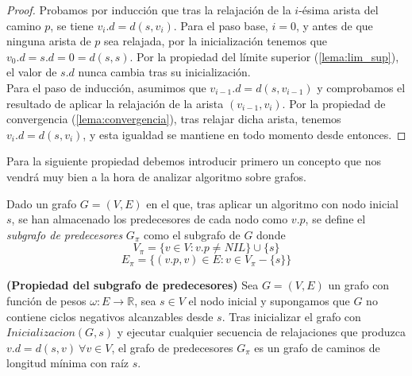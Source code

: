 \begin{proof}
	Probamos por inducción que tras la relajación de la $i$-ésima arista del camino $p$, se tiene $v_i.d=d(s,v_i)$. Para el paso base, $i=0$, y antes de que ninguna arista de $p$ sea relajada, por la inicialización tenemos que $v_0.d=s.d=0=d(s,s)$. Por la propiedad del límite superior (\autoref{lema:lim_sup}), el valor de $s.d$ nunca cambia tras su inicialización. \\
	Para el paso de inducción, asumimos que $v_{i-1}.d=d(s,v_{i-1})$ y comprobamos el resultado de aplicar la relajación de la arista $(v_{i-1},v_i)$. Por la propiedad de convergencia (\autoref{lema:convergencia}), tras relajar dicha arista, tenemos $v_i.d=d(s,v_i)$, y esta igualdad se mantiene en todo momento desde entonces.
\end{proof}

Para la siguiente propiedad debemos introducir primero un concepto que nos vendrá muy bien a la hora de analizar algoritmo sobre grafos.

\begin{definicion}
	Dado un grafo $G=(V,E)$ en el que, tras aplicar un algoritmo con nodo inicial $s$, se han almacenado los predecesores de cada nodo como $v.p$, se define el \textit{subgrafo de predecesores} $G_{\pi}$ como el subgrafo de $G$ donde
	$$V_{\pi}=\{v\in V : v.p \neq NIL\}\cup \{s\}$$
	$$E_{\pi}=\{(v.p,v)\in E : v\in V_{\pi}-\{s\}\}$$
\end{definicion}

\begin{proposicion}\label{prop:subg_pred}
	\textbf{(Propiedad del subgrafo de predecesores)} Sea $G=(V,E)$ un grafo con función de pesos $\omega : E\rightarrow \mathbb{R}$, sea $s\in V$ el nodo inicial y supongamos que $G$ no contiene ciclos negativos alcanzables desde $s$. Tras inicializar el grafo con $Inicializacion(G,s)$ y ejecutar cualquier secuencia de relajaciones que produzca $v.d=d(s,v)\ \forall v\in V$, el grafo de predecesores $G_{\pi}$ es un grafo de caminos de longitud mínima con raíz $s$.
\end{proposicion}

